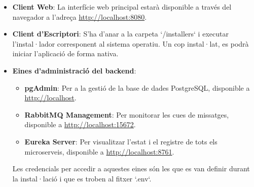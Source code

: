 \begin{itemize}
    \item \textbf{Client Web}: La interfície web principal estarà disponible a través del navegador a l'adreça \href{http://localhost:8080}{http://localhost:8080}.
    
    \item \textbf{Client d'Escriptori}: S'ha d'anar a la carpeta `/installers` i executar l'instal·lador corresponent al sistema operatiu. Un cop instal·lat, es podrà iniciar l'aplicació de forma nativa.
    
    \item \textbf{Eines d'administració del backend}:
    \begin{itemize}
        \item \textbf{pgAdmin}: Per a la gestió de la base de dades PostgreSQL, disponible a \href{http://localhost}{http://localhost}.
        \item \textbf{RabbitMQ Management}: Per monitorar les cues de missatges, disponible a \href{http://localhost:15672}{http://localhost:15672}.
        \item \textbf{Eureka Server}: Per visualitzar l'estat i el registre de tots els microserveis, disponible a \href{http://localhost:8761}{http://localhost:8761}.
    \end{itemize}
    Les credencials per accedir a aquestes eines són les que es van definir durant la instal·lació i que es troben al fitxer `.env`.
\end{itemize}
